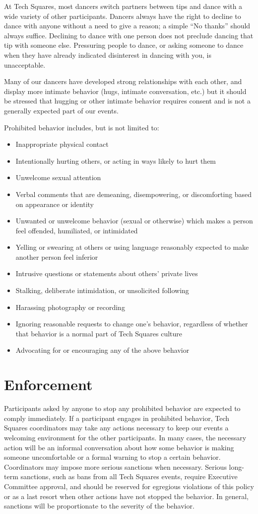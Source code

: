 \documentclass{article}
\begin{document}
At Tech Squares, most dancers switch partners between tips and dance with a wide variety of other participants. Dancers always have the right to decline to dance with anyone without a need to give a reason; a simple ``No thanks'' should always suffice. Declining to dance with one person does not preclude dancing that tip with someone else. Pressuring people to dance, or asking someone to dance when they have already indicated disinterest in dancing with you, is unacceptable.

Many of our dancers have developed strong relationships with each other, and display more intimate behavior (hugs, intimate conversation, etc.) but it should be stressed that hugging or other intimate behavior requires consent and is not a generally expected part of our events.

Prohibited behavior includes, but is not limited to:
\begin{itemize}
\item Inappropriate physical contact
\item Intentionally hurting others, or acting in ways likely to hurt them
\item Unwelcome sexual attention
\item Verbal comments that are demeaning, disempowering, or discomforting based on appearance or identity
\item Unwanted or unwelcome behavior (sexual or otherwise) which makes a person feel offended, humiliated, or intimidated
\item Yelling or swearing at others or using language reasonably expected to make another person feel inferior
\item Intrusive questions or statements about others' private lives
\item Stalking, deliberate intimidation, or unsolicited following
\item Harassing photography or recording
\item Ignoring reasonable requests to change one's behavior, regardless of whether that behavior is a normal part of Tech Squares culture
\item Advocating for or encouraging any of the above behavior
\end{itemize}

\section{Enforcement}
Participants asked by anyone to stop any prohibited behavior are expected to comply immediately.
If a participant engages in prohibited behavior, Tech Squares coordinators may take any actions necessary to keep our events a welcoming environment for the other participants. In many cases, the necessary action will be an informal conversation about how some behavior is making someone uncomfortable or a formal warning to stop a certain behavior. Coordinators may impose more serious sanctions when necessary. Serious long-term sanctions, such as bans from all Tech Squares events, require Executive Committee approval, and should be reserved for egregious violations of this policy or as a last resort when other actions have not stopped the behavior. In general, sanctions will be proportionate to the severity of the behavior.
\end{document}
